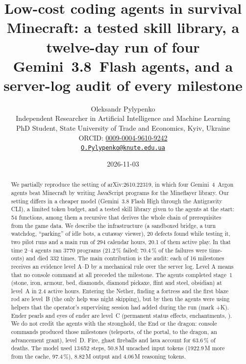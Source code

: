 \documentclass[11pt]{article}
\begin{document}

\title{Low-cost coding agents in survival Minecraft: a tested skill library, a twelve-day run of four Gemini~3.8~Flash agents, and a server-log audit of every milestone}
\author{Oleksandr Pylypenko\\[4pt]
\small Independent Researcher in Artificial Intelligence and Machine Learning\\
\small PhD Student, State University of Trade and Economics, Kyiv, Ukraine\\
\small ORCID: \href{https://orcid.org/0009-0004-9610-9242}{0009-0004-9610-9242}\\
\small\href{mailto:O.Pylypenko@knute.edu.ua}{\texttt{O.Pylypenko@knute.edu.ua}}}
\date{2026-11-03}
\maketitle

\begin{abstract}
\noindent
We partially reproduce the setting of arXiv:2610.22319, in which four Gemini~4~Argon agents beat Minecraft by writing JavaScript programs for the Mineflayer library. Our setting differs in a cheaper model (Gemini~3.8 Flash High through the Antigravity CLI), a limited token budget, and a tested skill library given to the agents at the start: 54 functions, among them a recursive  that derives the whole chain of prerequisites from the game data. We describe the infrastructure (a sandboxed bridge, a turn watchdog, ``parking'' of idle bots, a cutaway viewer), 20 defects found while testing it, two pilot runs and a main run of 294 calendar hours, 20.1 of them active play. In that time 2--4 agents ran 3770 programs (21.2\,\% failed; 70.4\,\% of the failures were time-outs) and died 332 times. The main contribution is the audit: each of 16 milestones receives an evidence level A--D by a mechanical rule over the server log. Level A means that no console command at all preceded the milestone. The agents completed stage~1 (stone, iron, armour, bed, diamonds, diamond pickaxe, flint and steel, obsidian) at level~A in 2.4 active hours. Entering the Nether, finding a fortress and the first blaze rod are level~B (the only help was night skipping), but by then the agents were using helpers that the operator's supervising session had added during the run (mark +K). Ender pearls and eyes of ender are level~C (permanent status effects, enchantments, ). We do not credit the agents with the stronghold, the End or the dragon: console commands produced those milestones (teleports,  of the portal,  to the dragon, an advancement grant), level~D. Fire, ghast fireballs and lava account for 63.6\,\% of deaths. The model used 13\,652 steps, 50.8\,M uncached input tokens (1922.9\,M more from the cache, 97.4\,\%), 8.82\,M output and 4.06\,M reasoning tokens.
\end{abstract}
\end{document}
